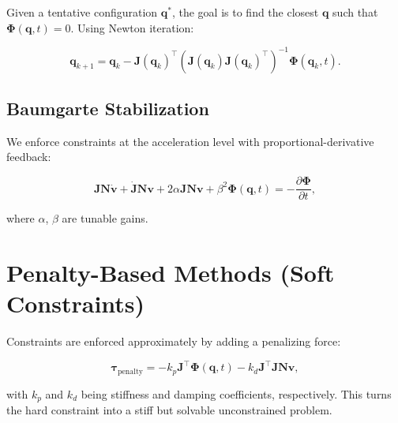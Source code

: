 \documentclass{article}
\begin{document}
Given a tentative configuration \( \bm{q}^* \), the goal is to find the closest
\( \bm{q} \) such that \( \bm{\Phi}(\bm{q}, t) = 0 \). Using Newton iteration:

\begin{equation}
    \bm{q}_{k+1} = \bm{q}_k - \bm{J}(\bm{q}_k)^\top \left( \bm{J}(\bm{q}_k) \bm{J}(\bm{q}_k)^\top \right)^{-1} \bm{\Phi}(\bm{q}_k, t).
\end{equation}

\subsection{Baumgarte Stabilization}

We enforce constraints at the acceleration level with proportional-derivative
feedback:

\begin{equation}
    \bm{J} \bm{N} \dot{\bm{v}} + \dot{\bm{J}} \bm{N} \bm{v} + 2\alpha \bm{J} \bm{N} \bm{v} + \beta^2 \bm{\Phi}(\bm{q}, t) = -\frac{\partial \bm{\Phi}}{\partial t},
\end{equation}

where \( \alpha \), \( \beta \) are tunable gains.

\section{Penalty-Based Methods (Soft Constraints)}

Constraints are enforced approximately by adding a penalizing force:

\begin{equation}
    \bm{\tau}_{\text{penalty}} = -k_p \bm{J}^\top \bm{\Phi}(\bm{q}, t) - k_d \bm{J}^\top \bm{J} \bm{N} \bm{v},
\end{equation}

with \( k_p \) and \( k_d \) being stiffness and damping coefficients,
respectively. This turns the hard constraint into a stiff but solvable
unconstrained problem.
\end{document}

